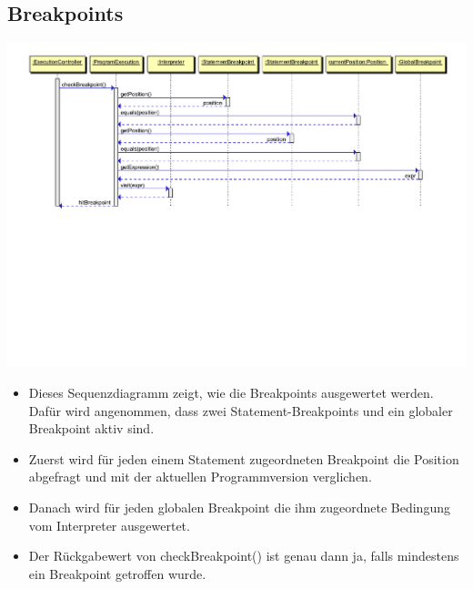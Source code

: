 \documentclass[10pt,a4paper,titlepage]{article}
\begin{document}
\subsection{Breakpoints}
\includegraphics[scale=0.6]{images/Breakpoints.pdf} \newline
\begin{itemize}
\item Dieses Sequenzdiagramm zeigt, wie die Breakpoints ausgewertet werden. Dafür wird angenommen, dass zwei Statement-Breakpoints und ein globaler Breakpoint aktiv sind.
\item Zuerst wird für jeden einem Statement zugeordneten Breakpoint die Position abgefragt und mit der aktuellen Programmversion verglichen.
\item Danach wird für jeden globalen Breakpoint die ihm zugeordnete Bedingung vom Interpreter ausgewertet.
\item Der Rückgabewert von checkBreakpoint() ist genau dann ja, falls mindestens ein Breakpoint getroffen wurde.
\end{itemize}
\end{document}

